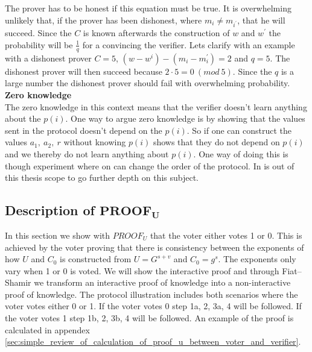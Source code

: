 \noindent
The prover has to be honest if this equation must be true. It is overwhelming unlikely that, if the prover has been dishonest, where $m_i \neq m_{i^{'}}$, that he will succeed. Since the $C$ is known afterwards the construction of $w$ and $w^{'}$ the probability will be \begin{math} \frac{1}{q}\end{math} for a convincing the verifier. Lets clarify with an example with a dishonest prover $C=5$, $(w-w^i)-(m_i - m_i^{'})=2$ and $q=5$. The dishonest prover will then succeed because $2 \cdot 5 = 0 \ (mod \ 5)$. Since the $q$ is a large number the dishonest prover should fail with overwhelming probability.\\


\noindent
\textbf{Zero knowledge}\\
The zero knowledge in this context means that the verifier doesn't learn anything about the $p(i)$. One way to argue zero knowledge is by showing that the values sent in the protocol doesn't depend on the $p(i)$. So if one can construct the values $a_1, \ a_2, \ r$  without knowing  $p(i)$  shows that they do not depend on $p(i)$ and we thereby do not learn anything about $p(i)$. One way of doing this is though experiment where on can change the order of the protocol. In is out of this thesis scope to go further depth on this subject.\\

 

\subsection{Description of $ \mathbf{PROOF_U} $} \label{sec:proof_u}
In this section we show with $PROOF_U$ that the voter either votes  1 or 0. This is achieved by the voter proving that there is consistency between the exponents of how \begin{math}U\end{math} and \begin{math}C_0\end{math} is constructed from \begin{math}U=G^{s+v}\end{math} and \begin{math}C_0 = g^s\end{math}. The exponents only vary when 1 or 0 is voted. We will show the interactive proof and through Fiat–Shamir  we transform an interactive proof of knowledge into a non-interactive proof of knowledge. The protocol illustration includes both scenarios where the voter votes either 0 or 1. If the voter votes 0 step 1a, 2, 3a, 4 will be followed. If the voter votes 1 step 1b, 2, 3b, 4 will be followed. An example of the proof is calculated in appendex \ref{sec:simple_review_of_calculation_of_proof_u_between_voter_and_verifier}.\\

